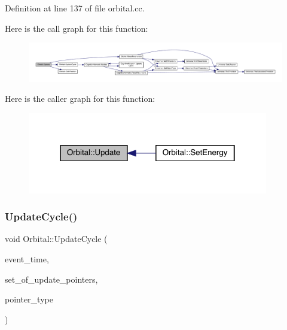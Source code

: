 Definition at line 137 of file orbital.\+cc.

Here is the call graph for this function\+:
\nopagebreak
\begin{figure}[H]
\begin{center}
\leavevmode
\includegraphics[width=350pt]{class_orbital_a837289c3b2af844724c381707dee40d0_cgraph}
\end{center}
\end{figure}
Here is the caller graph for this function\+:
\nopagebreak
\begin{figure}[H]
\begin{center}
\leavevmode
\includegraphics[width=298pt]{class_orbital_a837289c3b2af844724c381707dee40d0_icgraph}
\end{center}
\end{figure}
\mbox{\label{class_orbital_afbf72ba4e260627422c9f53dea793923}} 
\subsubsection{\texorpdfstring{Update\+Cycle()}{UpdateCycle()}}
{\footnotesize\ttfamily void Orbital\+::\+Update\+Cycle (\begin{DoxyParamCaption}\item[{std\+::chrono\+::time\+\_\+point$<$ \hyperlink{universe_8h_a0ef8d951d1ca5ab3cfaf7ab4c7a6fd80}{Clock} $>$}]{event\+\_\+time,  }\item[{std\+::vector$<$ \hyperlink{class_cognitive_network}{Cognitive\+Network} $\ast$$>$}]{set\+\_\+of\+\_\+update\+\_\+pointers,  }\item[{unsigned int}]{pointer\+\_\+type }\end{DoxyParamCaption})}



